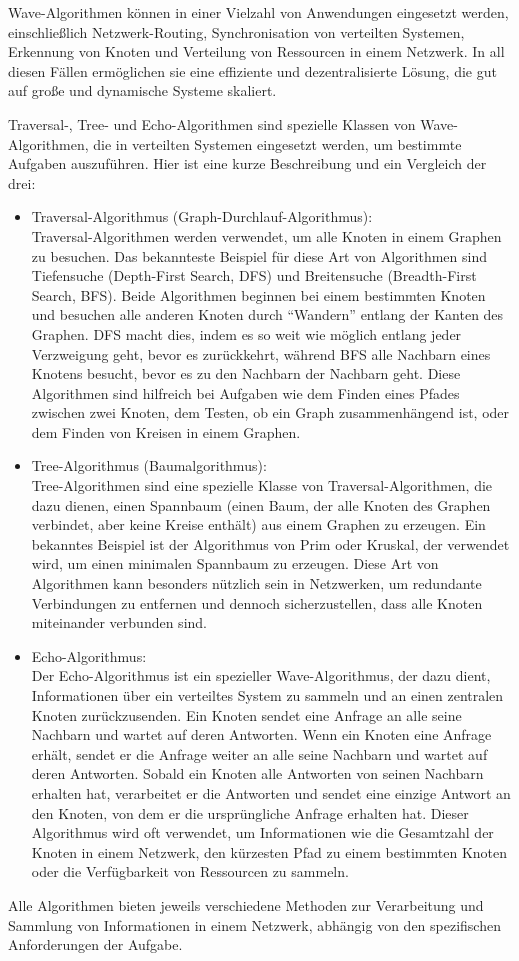 Wave-Algorithmen können in einer Vielzahl von Anwendungen eingesetzt werden, einschließlich Netzwerk-Routing, Synchronisation von verteilten Systemen, Erkennung von Knoten und Verteilung von Ressourcen in einem Netzwerk. In all diesen Fällen ermöglichen sie eine effiziente und dezentralisierte Lösung, die gut auf große und dynamische Systeme skaliert.

Traversal-, Tree- und Echo-Algorithmen sind spezielle Klassen von Wave-Algorithmen, die in verteilten Systemen eingesetzt werden, um bestimmte Aufgaben auszuführen. Hier ist eine kurze Beschreibung und ein Vergleich der drei:
\begin{itemize}
\item Traversal-Algorithmus (Graph-Durchlauf-Algorithmus): \\Traversal-Algorithmen werden verwendet, um alle Knoten in einem Graphen zu besuchen. Das bekannteste Beispiel für diese Art von Algorithmen sind Tiefensuche (Depth-First Search, DFS) und Breitensuche (Breadth-First Search, BFS). Beide Algorithmen beginnen bei einem bestimmten Knoten und besuchen alle anderen Knoten durch \enquote{Wandern} entlang der Kanten des Graphen. DFS macht dies, indem es so weit wie möglich entlang jeder Verzweigung geht, bevor es zurückkehrt, während BFS alle Nachbarn eines Knotens besucht, bevor es zu den Nachbarn der Nachbarn geht. Diese Algorithmen sind hilfreich bei Aufgaben wie dem Finden eines Pfades zwischen zwei Knoten, dem Testen, ob ein Graph zusammenhängend ist, oder dem Finden von Kreisen in einem Graphen.
\item Tree-Algorithmus (Baumalgorithmus): \\Tree-Algorithmen sind eine spezielle Klasse von Traversal-Algorithmen, die dazu dienen, einen Spannbaum (einen Baum, der alle Knoten des Graphen verbindet, aber keine Kreise enthält) aus einem Graphen zu erzeugen. Ein bekanntes Beispiel ist der Algorithmus von Prim oder Kruskal, der verwendet wird, um einen minimalen Spannbaum zu erzeugen. Diese Art von Algorithmen kann besonders nützlich sein in Netzwerken, um redundante Verbindungen zu entfernen und dennoch sicherzustellen, dass alle Knoten miteinander verbunden sind.
\item Echo-Algorithmus: \\Der Echo-Algorithmus ist ein spezieller Wave-Algorithmus, der dazu dient, Informationen über ein verteiltes System zu sammeln und an einen zentralen Knoten zurückzusenden. Ein Knoten sendet eine Anfrage an alle seine Nachbarn und wartet auf deren Antworten. Wenn ein Knoten eine Anfrage erhält, sendet er die Anfrage weiter an alle seine Nachbarn und wartet auf deren Antworten. Sobald ein Knoten alle Antworten von seinen Nachbarn erhalten hat, verarbeitet er die Antworten und sendet eine einzige Antwort an den Knoten, von dem er die ursprüngliche Anfrage erhalten hat. Dieser Algorithmus wird oft verwendet, um Informationen wie die Gesamtzahl der Knoten in einem Netzwerk, den kürzesten Pfad zu einem bestimmten Knoten oder die Verfügbarkeit von Ressourcen zu sammeln.
\end{itemize}
Alle Algorithmen bieten jeweils verschiedene Methoden zur Verarbeitung und Sammlung von Informationen in einem Netzwerk, abhängig von den spezifischen Anforderungen der Aufgabe.

